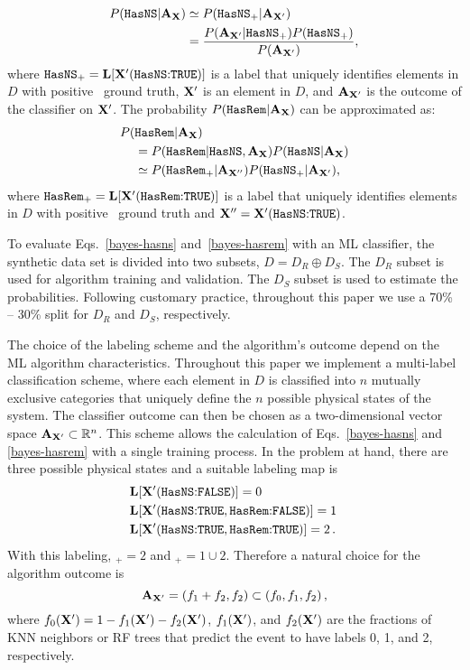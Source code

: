 \begin{align}
\label{bayes-hasns}
P({{\tt HasNS}}|{\bf A}_{\bf X})&\simeq P({{\tt HasNS}}_+|{\bf A}_{{\bf X}'}) \nonumber \\
&=\frac{P({\bf A}_{{\bf X}'}|{{\tt HasNS}}_+)P({{\tt HasNS}}_+)}{P({\bf A}_{{\bf X}'})},
\end{align}
where ${{\tt HasNS}}_+={\bf L}[{\bf X}'(\hbox{{{\tt HasNS}}:{{\tt TRUE}}})]$ is a label that uniquely identifies elements in $D$ with positive \hasns\ ground truth, ${\bf X}'$ is an element in $D$, and ${\bf A}_{{\bf X}'}$ is the outcome of the classifier on ${\bf X}'$. The probability $P({{\tt HasRem}}|{\bf A}_{\bf X})$ can be approximated as:
\begin{align}
\label{bayes-hasrem}
P(&{{\tt HasRem}}|{\bf A}_{\bf X}) \\
&=P({{\tt HasRem}}|{{\tt HasNS}}, {\bf A}_{\bf X})P({{\tt HasNS}}|{\bf A}_{\bf X}) \nonumber \\
&\simeq P({{\tt HasRem}}_+|{\bf A}_{{\bf X}''})P({{\tt HasNS}}_+|{\bf A}_{{\bf X}'}),
\end{align}
where ${{\tt HasRem}}_+={\bf L}[{\bf X}'(\hbox{{{\tt HasRem}}:{{\tt TRUE}}})]$ is a label that uniquely identifies elements in $D$ with positive \hasrem\ ground truth and ${\bf X}''= {\bf X}'(\hbox{{{\tt HasNS}}:{{\tt TRUE}}})$.

To evaluate Eqs.~\eqref{bayes-hasns} and~\eqref{bayes-hasrem} with an \ac{ML} classifier, the synthetic data set is divided into two subsets, $D=D_R\oplus D_S$. The $D_R$ subset is used for
algorithm training and validation. The $D_S$ subset is used to estimate the probabilities. Following customary practice, throughout this paper we use a 70\% -- 30\% split for $D_R$ and $D_S$,
respectively.

The choice of the labeling scheme and the algorithm's outcome depend on the \ac{ML} algorithm characteristics. Throughout this paper we implement a multi-label classification scheme, where each
element in $D$ is classified into $n$ mutually exclusive categories that uniquely define the $n$ possible physical states of the system. The classifier outcome can then be chosen as a
two-dimensional vector space ${\bf A}_{{\bf X}'}\subset \mathbb{R}^n$. This scheme allows the calculation of Eqs.~\eqref{bayes-hasns} and \eqref{bayes-hasrem} with a single training process. In
the problem at hand, there are three possible physical states and a suitable labeling
map is 
%
\begin{align}
&{\bf L}[{\bf X}'(\hbox{{{\tt HasNS}}:{{\tt FALSE}}})]=0\,\nonumber\\
&{\bf L}[{\bf X}'(\hbox{{{\tt HasNS}}:{{\tt TRUE}}},\hbox{{{\tt HasRem}}:{{\tt FALSE}}})]=1\,\\
&{\bf L}[{\bf X}'(\hbox{{{\tt HasNS}}:{{\tt TRUE}}},\hbox{{{\tt HasRem}}:{{\tt TRUE}}})]=2\,.\nonumber
\end{align}
%
With this labeling, \hasrem$_+=2$ and \hasns$_+=1\cup 2$. Therefore a natural choice for the algorithm outcome is
%
\begin{equation}
{\bf A}_{\bf X'}=(f_1+f_2,f_2)\subset (f_0,f_1,f_2)\,,
\end{equation}
%
where $f_0({\bf X}')=1-f_1({\bf X}')-f_2({\bf X}')$, $f_1({\bf X}')$, and $f_2({\bf X}')$ are the fractions of \ac{KNN} neighbors or \ac{RF} trees that predict the event to
have labels 0, 1, and 2, respectively.

